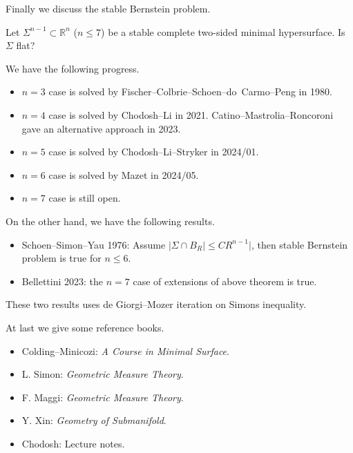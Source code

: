 Finally we discuss the stable Bernstein problem.
\begin{pro}
    Let $\Sigma^{n-1}\subset\mathbb{R}^n$ ($n\leq 7$) be a stable complete two-sided minimal hypersurface.
    Is $\Sigma$ flat?
\end{pro}

We have the following progress.
\begin{itemize}
    \item $n=3$ case is solved by Fischer--Colbrie--Schoen--do~Carmo--Peng in 1980.
    \item $n=4$ case is solved by Chodosh--Li in 2021.
    Catino--Mastrolia--Roncoroni gave an alternative approach in 2023.
    \item $n=5$ case is solved by Chodosh--Li--Stryker in 2024/01.
    \item $n=6$ case is solved by Mazet in 2024/05.
    \item $n=7$ case is still open.
\end{itemize}

On the other hand, we have the following results.
\begin{itemize}
    \item Schoen--Simon--Yau 1976: Assume $|\Sigma\cap B_R|\leq CR^{n-1}|$, then stable Bernstein problem is true for $n\leq 6$.
    \item Bellettini 2023: the $n=7$ case of extensions of above theorem is true.
\end{itemize}
These two results uses de Giorgi--Mozer iteration on Simons inequality.

At last we give some reference books.
\begin{itemize}
    \item Colding--Minicozi: \emph{A Course in Minimal Surface}.
    \item L. Simon: \emph{Geometric Measure Theory}.
    \item F. Maggi: \emph{Geometric Measure Theory}.
    \item Y. Xin: \emph{Geometry of Submanifold}.
    \item Chodosh: Lecture notes.   
\end{itemize}